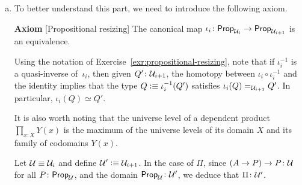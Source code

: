 \begin{solution}
\begin{enumerate}[a)]
        To check the recursion principle of $\Pi$, let us define
        \begin{align*}
            \ev{}\colon A&\to\Pi\\
            a&\mapsto\lambda P.\,\ev a^P.
        \end{align*}
        Given $f\colon A\to Q$, the function $\psi(f)$ makes the following diagram judgmentally commutative:
        \[
            \begin{tikzcd}[baseline=(top.base)]
                |[alias=top]| A
                        \arrow[r,"f"]
                        \arrow[d,"\ev{}"']
                    &Q\\
                \Pi
                        \arrow[ru,"\psi(f)"']
            \end{tikzcd}
            \qquad
            \begin{aligned}[t]
                \psi(f)\circ\ev{}(a)
                    &\equiv (\lambda\pi.\,\pi(Q)(f))(\lambda P.\,\ev a^P)\\
                    &\equiv (\lambda P.\,\ev a^P)(Q)(f)\\
                    &\equiv \ev a^Q(f)\\
                    &\equiv f(a).
            \end{aligned}
        \]

        \item To better understand this part, we need to introduce the following axiom.

        \textbf{Axiom} [Propositional resizing] The canonical map $\iota_i\colon\fun{Prop}_{\univ_i}\to\fun{Prop}_{\univ_{i+1}}$ is an equivalence.

        Using the notation of Exercise~\ref{exr:propositional-resizing}, note that if $\iota_i^{-1}$ is a quasi-inverse of~$\iota_i$, then given $Q'\colon\univ_{i+1}$, the homotopy between $\iota_i\circ\iota_i^{-1}$ and the identity implies that the type $Q\mathrel{\vcentcolon}\equiv\iota_i^{-1}(Q')$ satisfies $\iota_i(Q)\mathrel{=_{\mathcal U_{i+1}}}Q'$. In particular, $\iota_i(Q)\simeq Q'$.

        It is also worth noting that the universe level of a dependent product $\prod_{x\colon X}Y(x)$ is the maximum of the universe levels of its domain $X$ and its family of codomains $Y(x)$.

        Let $\mathcal U\equiv\mathcal U_i$ and define $\mathcal U'\mathrel{\vcentcolon}\equiv\mathcal U_{i+1}$. In the case of $\Pi$, since $(A\to P)\to P\colon\univ$ for all $P\colon\fun{Prop}_{\univ}$, and the domain $\fun{Prop}_{\univ}\colon\univ'$, we deduce that $\Pi\colon\univ'$.
        

\end{enumerate}
\end{solution}
